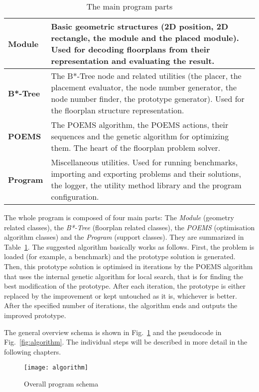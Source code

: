 \begin{table}
\centering
\begin{tabular}{|p{}|p{}|}
\hline
{\bf Module} & Basic geometric structures (2D position, 2D rectangle, the module and the placed module). Used for decoding floorplans from their representation and evaluating the result. \\
\hline
{\bf B*-Tree} & The B*-Tree node and related utilities (the placer, the placement evaluator, the node number generator, the node number finder, the prototype generator). Used for the floorplan structure representation. \\
\hline
{\bf POEMS} & The POEMS algorithm, the POEMS actions, their sequences and the genetic algorithm for optimizing them. The heart of the floorplan problem solver. \\
\hline
{\bf Program} & Miscellaneous utilities. Used for running benchmarks, importing and exporting problems and their solutions, the logger, the utility method library and the program configuration. \\
\hline
\end{tabular}
\caption{The main program parts}
\label{tab:parts}
\end{table}

The whole program is composed of four main parts: The {\em Module} (geometry related classes), the {\em B*-Tree} (floorplan related classes), the {\em POEMS} (optimisation algorithm classes) and the {\em Program} (support classes). They are summarized in Table~\ref{tab:parts}. The suggested algorithm basically works as follows. First, the problem is loaded (for example, a benchmark) and the prototype solution is generated. Then, this prototype solution is optimised in iterations by the POEMS algorithm \cite{poems} that uses the internal genetic algorithm for local search, that is for finding the best modification of the prototype. After each iteration, the prototype is either replaced by the improvement or kept untouched as it is, whichever is better. After the specified number of iterations, the algorithm ends and outputs the improved prototype. 

The general overview schema is shown in Fig.~\ref{fig:overview} and the pseudocode in Fig.~\ref{fig:algorithm}. The individual steps will be described in more detail in the following chapters.

\begin{figure}
\centering
\texttt{[image: algorithm]}
\caption{Overall program schema}
\label{fig:overview}
\end{figure}

